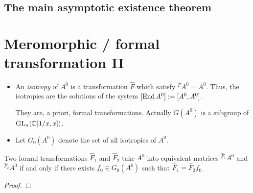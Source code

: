 \subsection{The main asymptotic existence theorem}
\begin{comment}
  \begin{multicols}{2}
    \textbf{Classical:}
    \begin{itemize}
      \item \cite[Thm.4.4.1]{Loday2014}
      \item \cite[Thm.7.10]{van2003galois}{\tiny\cite[Thm.7.12]{van2003galois}}
      \item \cite[Thm.12.1]{wasow2002asymptotic}
      \item \cite[5.3.Thm.1]{Varadarajan96linearmeromorphic}
    \end{itemize}
  \columnbreak
    \textbf{Sheafical:}
    \begin{itemize}
      \item \cite[Thm.2.3.1]{sabbah_cimpa90}
    \end{itemize}
  \end{multicols}
\end{comment}

\section{Meromorphic / formal transformation II}
\begin{defn}
  \begin{itemize}
    \item An \emph{isotropy} of $A^0$ is a transformation $\hat F$ which
      satisfy ${}^{\hat F}\!A^0=A^0$.
      Thus, the isotropies are the solutions of the system
      $[\operatorname{End} A^0]:=[A^0,A^0]$.
      \begin{rem}
        They are, a priori, formal transformations. Actually $G(A^0)$ is a
        subgroup of $\operatorname{GL}_n(\mathbb{C}[1/x,x])$.
      \end{rem}
    \item Let $G_0(A^0)$ denote the set of all isotropies of $A^0$.
      \begin{comment}
        In the nice case this is only $T$?
      \end{comment}
  \end{itemize}
\end{defn}
\begin{lem}
  Two formal transformations $\hat F_1$ and $\hat F_2$ take $A^0$ into
  equivalent matrices ${}^{\hat F_1}\!A^0$ and  ${}^{\hat F_2}\!A^0$ if and
  only if there exists $f_0\in G_0(A^0)$ such that $\hat F_1=\hat F_2f_0$.
\end{lem}
\begin{proof}
  \TODO
\end{proof}

